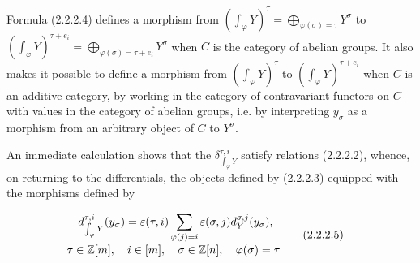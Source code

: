 Formula (2.2.2.4) defines a morphism from
$\left(\int_\varphi Y\right)^\tau
=\bigoplus_{\varphi(\sigma)=\tau}Y^\sigma$ to
$\left(\int_\varphi Y\right)^{\tau+e_i}
=\bigoplus_{\varphi(\sigma)=\tau+e_i}Y^\sigma$ when $C$ is the category
of abelian groups. It also makes it possible to define a morphism from
$\left(\int_\varphi Y\right)^\tau$ to
$\left(\int_\varphi Y\right)^{\tau+e_i}$ when $C$ is an additive category,
by working in the category of contravariant functors on $C$ with values
in the category of abelian groups, i.e. by interpreting $y_\sigma$ as a
morphism from an arbitrary object of $C$ to $Y^\sigma$.

An immediate calculation shows that the
$\delta_{\int_\varphi Y}^{\tau,i}$ satisfy relations (2.2.2.2), whence,
on returning to the differentials, the objects defined by (2.2.2.3)
equipped with the morphisms defined by

\begin{equation}
  \begin{aligned}
    d_{\int_\varphi Y}^{\tau,i}(y_\sigma)
      &=\varepsilon(\tau,i)
        \sum_{\varphi(j)=i}
          \varepsilon(\sigma,j)d_Y^{\sigma,j}(y_\sigma),\\[-1mm]
    &\hspace{-18mm}
      \tau\in\mathbb Z[m],\quad i\in[m],\quad
      \sigma\in\mathbb Z[n],\quad\varphi(\sigma)=\tau
  \end{aligned}
  \tag{2.2.2.5}
\end{equation}
